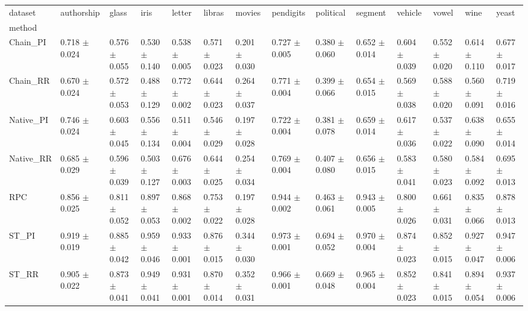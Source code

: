 \begin{tabular}{llllllllllllll}
\toprule
dataset &           authorship &                glass &                 iris &               letter &               libras &               movies &            pendigits &            political &              segment &              vehicle &                vowel &                 wine &                yeast \\
method    &                      &                      &                      &                      &                      &                      &                      &                      &                      &                      &                      &                      &                      \\
\midrule
Chain_PI  &  0.718 $ \pm $ 0.024 &  0.576 $ \pm $ 0.055 &  0.530 $ \pm $ 0.140 &  0.538 $ \pm $ 0.005 &  0.571 $ \pm $ 0.023 &  0.201 $ \pm $ 0.030 &  0.727 $ \pm $ 0.005 &  0.380 $ \pm $ 0.060 &  0.652 $ \pm $ 0.014 &  0.604 $ \pm $ 0.039 &  0.552 $ \pm $ 0.020 &  0.614 $ \pm $ 0.110 &  0.677 $ \pm $ 0.017 \\
Chain_RR  &  0.670 $ \pm $ 0.024 &  0.572 $ \pm $ 0.053 &  0.488 $ \pm $ 0.129 &  0.772 $ \pm $ 0.002 &  0.644 $ \pm $ 0.023 &  0.264 $ \pm $ 0.037 &  0.771 $ \pm $ 0.004 &  0.399 $ \pm $ 0.066 &  0.654 $ \pm $ 0.015 &  0.569 $ \pm $ 0.038 &  0.588 $ \pm $ 0.020 &  0.560 $ \pm $ 0.091 &  0.719 $ \pm $ 0.016 \\
Native_PI &  0.746 $ \pm $ 0.024 &  0.603 $ \pm $ 0.045 &  0.556 $ \pm $ 0.134 &  0.511 $ \pm $ 0.004 &  0.546 $ \pm $ 0.029 &  0.197 $ \pm $ 0.028 &  0.722 $ \pm $ 0.004 &  0.381 $ \pm $ 0.078 &  0.659 $ \pm $ 0.014 &  0.617 $ \pm $ 0.036 &  0.537 $ \pm $ 0.022 &  0.638 $ \pm $ 0.090 &  0.655 $ \pm $ 0.014 \\
Native_RR &  0.685 $ \pm $ 0.029 &  0.596 $ \pm $ 0.039 &  0.503 $ \pm $ 0.127 &  0.676 $ \pm $ 0.003 &  0.644 $ \pm $ 0.025 &  0.254 $ \pm $ 0.034 &  0.769 $ \pm $ 0.004 &  0.407 $ \pm $ 0.080 &  0.656 $ \pm $ 0.015 &  0.583 $ \pm $ 0.041 &  0.580 $ \pm $ 0.023 &  0.584 $ \pm $ 0.092 &  0.695 $ \pm $ 0.013 \\
RPC       &  0.856 $ \pm $ 0.025 &  0.811 $ \pm $ 0.052 &  0.897 $ \pm $ 0.053 &  0.868 $ \pm $ 0.002 &  0.753 $ \pm $ 0.022 &  0.197 $ \pm $ 0.028 &  0.944 $ \pm $ 0.002 &  0.463 $ \pm $ 0.061 &  0.943 $ \pm $ 0.005 &  0.800 $ \pm $ 0.026 &  0.661 $ \pm $ 0.031 &  0.835 $ \pm $ 0.066 &  0.878 $ \pm $ 0.013 \\
ST_PI     &  0.919 $ \pm $ 0.019 &  0.885 $ \pm $ 0.042 &  0.959 $ \pm $ 0.046 &  0.933 $ \pm $ 0.001 &  0.876 $ \pm $ 0.015 &  0.344 $ \pm $ 0.030 &  0.973 $ \pm $ 0.001 &  0.694 $ \pm $ 0.052 &  0.970 $ \pm $ 0.004 &  0.874 $ \pm $ 0.023 &  0.852 $ \pm $ 0.015 &  0.927 $ \pm $ 0.047 &  0.947 $ \pm $ 0.006 \\
ST_RR     &  0.905 $ \pm $ 0.022 &  0.873 $ \pm $ 0.041 &  0.949 $ \pm $ 0.041 &  0.931 $ \pm $ 0.001 &  0.870 $ \pm $ 0.014 &  0.352 $ \pm $ 0.031 &  0.966 $ \pm $ 0.001 &  0.669 $ \pm $ 0.048 &  0.965 $ \pm $ 0.004 &  0.852 $ \pm $ 0.023 &  0.841 $ \pm $ 0.015 &  0.894 $ \pm $ 0.054 &  0.937 $ \pm $ 0.006 \\
\bottomrule
\end{tabular}
